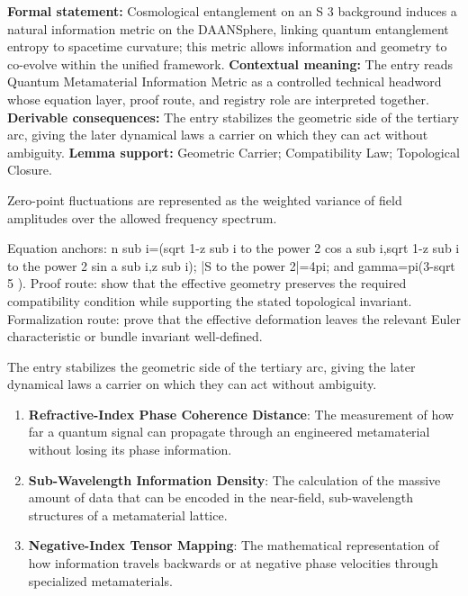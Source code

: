 \begingroup\footnotesize\setlength{\emergencystretch}{3em}\sloppy
\textbf{Formal statement:} Cosmological entanglement on an S 3 background induces a natural information metric on the DAANSphere, linking quantum entanglement entropy to spacetime curvature; this metric allows information and geometry to co-evolve within the unified framework. \textbf{Contextual meaning:} The entry reads Quantum Metamaterial Information Metric as a controlled technical headword whose equation layer, proof route, and registry role are interpreted together. \textbf{Derivable consequences:} The entry stabilizes the geometric side of the tertiary arc, giving the later dynamical laws a carrier on which they can act without ambiguity. \textbf{Lemma support:} Geometric Carrier; Compatibility Law; Topological Closure.\par
\endgroup

Zero-point fluctuations are represented as the weighted variance of field amplitudes over the allowed frequency spectrum.

Equation anchors: n sub i=(sqrt 1-z sub i to the power 2 cos a sub i,sqrt 1-z sub i to the power 2 sin a sub i,z sub i); |S to the power 2|=4pi; and gamma=pi(3-sqrt 5 ). Proof route: show that the effective geometry preserves the required compatibility condition while supporting the stated topological invariant. Formalization route: prove that the effective deformation leaves the relevant Euler characteristic or bundle invariant well-defined.

The entry stabilizes the geometric side of the tertiary arc, giving the later dynamical laws a carrier on which they can act without ambiguity.
\endgroup

\begin{enumerate}[leftmargin=1.6em,itemsep=6pt,topsep=4pt]
\item \textbf{Refractive-Index Phase Coherence Distance}: The measurement of how far a quantum signal can propagate through an engineered metamaterial without losing its phase information.
\item \textbf{Sub-Wavelength Information Density}: The calculation of the massive amount of data that can be encoded in the near-field, sub-wavelength structures of a metamaterial lattice.
\item \textbf{Negative-Index Tensor Mapping}: The mathematical representation of how information travels backwards or at negative phase velocities through specialized metamaterials.
\end{enumerate}

